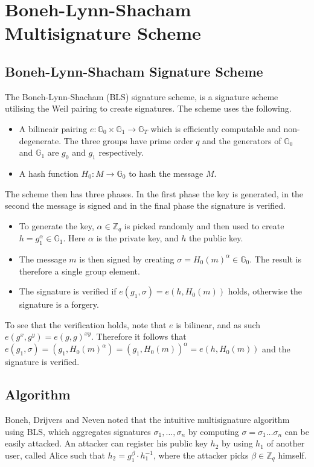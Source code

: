 \chapter{Boneh-Lynn-Shacham Multisignature Scheme}
\section{Boneh-Lynn-Shacham Signature Scheme}
The Boneh-Lynn-Shacham \cite{BLS} (BLS) signature scheme, is a signature scheme utilising the Weil pairing to create signatures. The scheme uses the following.
\begin{itemize}
	\item A bilineair pairing $e:\mathbb{G}_0 \times \mathbb{G}_1 \to \mathbb{G}_T$ which is efficiently computable and non-degenerate. The three groups have prime order $q$ and the generators of $\mathbb{G}_0$ and $\mathbb{G}_1$ are $g_0$ and $g_1$ respectively.
	\item A hash function $H_0:M\to \mathbb{G}_0$ to hash the message $M$.
\end{itemize}
The scheme then has three phases. In the first phase the key is generated, in the second the message is signed and in the final phase the signature is verified.
\begin{itemize}
	\item To generate the key, $\alpha \in \mathbb{Z}_q$ is picked randomly and then used to create $h=g_1^\alpha\in\mathbb{G}_1$. Here $\alpha$ is the private key, and $h$ the public key.
	\item The message $m$ is then signed by creating $\sigma=H_0(m)^\alpha\in\mathbb{G}_0$. The result is therefore a single group element.
	\item The signature is verified if $e(g_1,\sigma)=e(h,H_0(m))$ holds, otherwise the signature is a forgery.
\end{itemize}
To see that the verification holds, note that $e$ is bilinear, and as such $e(g^x,g^y)=e(g,g)^{xy}$. Therefore it follows that $e(g_1,\sigma)=(g_1,H_0(m)^\alpha)=(g_1,H_0(m))^\alpha=e(h,H_0(m))$ and the signature is verified.
\section{Algorithm}
Boneh, Drijvers and Neven noted \cite{BLSMulti} that the intuitive multisignature algorithm using BLS, which aggregates signatures $\sigma_1,\dots,\sigma_n$ by computing $\sigma=\sigma_1\dots\sigma_n$ can be easily attacked. An attacker can register his public key $h_2$ by using $h_1$ of another user, called Alice such that $h_2=g_1^\beta\cdot h_1^{-1}$, where the attacker picks $\beta\in\mathbb{Z}_q$ himself.

